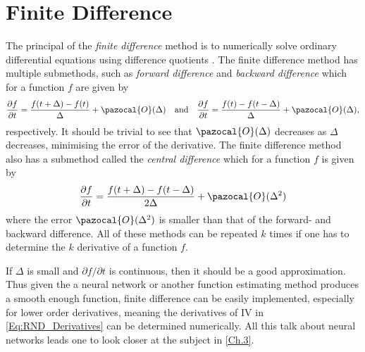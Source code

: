 \section{Finite Difference}\label{Sec.Finite_Difference}
The principal of the \emph{finite difference} method is to numerically solve ordinary differential equations using difference quotients \citep{Hull}. The finite difference method has multiple submethods, such as \emph{forward difference} and \emph{backward difference} which for a function $f$ are given by
\begin{align*}
    \frac{\partial f}{\partial t}=\frac{f(t+\Delta)-f(t)}{\Delta}+\pazocal{O}(\Delta)\quad\textrm{and}\quad\frac{\partial f}{\partial t}=\frac{f(t)-f(t-\Delta)}{\Delta}+\pazocal{O}(\Delta),
\end{align*}
respectively. It should be trivial to see that $\pazocal{O}(\Delta)$ decreases as $\Delta$ decreases, minimising the error of the derivative. The finite difference method also has a submethod called the \emph{central difference} which for a function $f$ is given by
\begin{align*}
    \frac{\partial f}{\partial t}=\frac{f(t+\Delta)-f(t-\Delta)}{2\Delta}+\pazocal{O}(\Delta^2)
\end{align*}
where the error $\pazocal{O}(\Delta^2)$ is smaller than that of the forward- and backward difference. All of these methods can be repeated $k$ times if one has to determine the $k$ derivative of a function $f$.

If $\Delta$ is small and $\partial f/\partial t$ is continuous, then it should be a good approximation. Thus given the a neural network or another function estimating method produces a smooth enough function, finite difference can be easily implemented, especially for lower order derivatives, meaning the derivatives of $\mathrm{IV}$ in \eqref{Eq:RND_Derivatives} can be determined numerically. All this talk about neural networks leads one to look closer at the subject in \autoref{Ch.3}.




